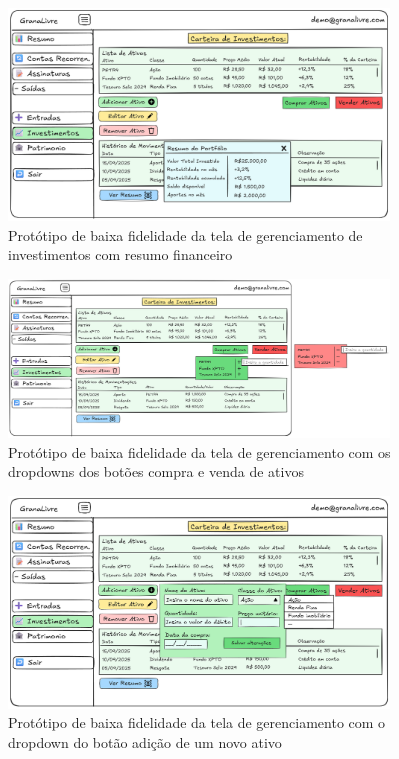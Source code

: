 \begin{figure}[H]
    \centering
    \includegraphics[width=0.9\textwidth]{imgs/08-investimentos_1.png}
    \caption{Protótipo de baixa fidelidade da tela de gerenciamento de investimentos com resumo financeiro}
    \label{fig:prot_investimentos2}
\end{figure}

\begin{figure}[H]
    \centering
    \includegraphics[width=0.9\textwidth]{imgs/08-investimentos_2.png}
    \caption{Protótipo de baixa fidelidade da tela de gerenciamento com os dropdowns dos botões compra e venda de ativos}
    \label{fig:prot_investimentos3}
\end{figure}

\begin{figure}[H]
    \centering
    \includegraphics[width=0.9\textwidth]{imgs/08-investimentos_3.png}
    \caption{Protótipo de baixa fidelidade da tela de gerenciamento com o dropdown do botão adição de um novo ativo}
    \label{fig:prot_investimentos4}
\end{figure}

